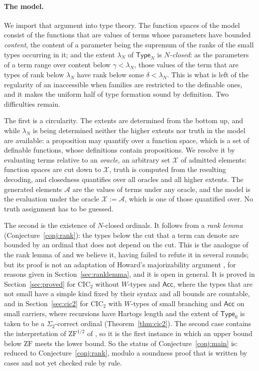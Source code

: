 \documentclass[10pt]{article}
\newcommand{\Type}{\mathsf{Type}}
\newcommand{\CIC}{\mathrm{CIC}}
\newcommand{\ZF}{\mathrm{ZF}}
\newcommand{\ZFh}{\mathrm{ZF}^{1/2}}
\newcommand{\X}{\mathcal{X}}
\newcommand{\A}{\mathcal{A}}
\newcommand{\Acc}{\mathsf{Acc}}
\begin{document}
\paragraph{The model.}
We import that argument into type theory. The function spaces of the
model consist of the functions that are values of terms whose
parameters have bounded \emph{content}, the content of a parameter being
the supremum of the ranks of the small types occurring in it; and the
extent $\lambda_N$ of $\Type_N$ is \emph{$N$-closed}: as the parameters of
a term range over content below $\gamma<\lambda_N$, those values of the
term that are types of rank below $\lambda_N$ have rank below some
$\delta<\lambda_N$. This is what is left of the regularity of an
inaccessible when families are restricted to the definable ones, and
it makes the uniform half of type formation sound by definition. Two
difficulties remain.

The first is a circularity. The extents are determined from the bottom
up, and while $\lambda_N$ is being determined neither the higher
extents nor truth in the model are available: a proposition may
quantify over a function space, which is a set of definable functions,
whose definitions contain propositions. We resolve it by evaluating
terms relative to an \emph{oracle}, an arbitrary set $\X$ of admitted
elements: function spaces are cut down to $\X$, truth is computed from
the resulting decoding, and closedness quantifies over all oracles and
all higher extents. The generated elements $\A$ are the values of terms
under any oracle, and the model is the evaluation under the oracle
$\X:=\A$, which is one of those quantified over. No truth assignment
has to be guessed.

The second is the existence of $N$-closed ordinals. It follows from a
\emph{rank lemma} (Conjecture~\ref{conj:rank}): the types below the cut
that a term can denote are bounded by an ordinal that does not depend
on the cut. This is the analogue of the rank lemma of \cite{paper2} and
we believe it, having failed to refute it in several rounds; but its
proof is not an adaptation of Howard's majorizability argument
\cite{howard73}, for reasons given in Section~\ref{sec:ranklemma}, and
it is open in general. It is proved in Section~\ref{sec:proved} for
$\CIC_2$ without $W$-types and $\Acc$, where the types that are not small
have a simple kind fixed by their syntax and all bounds are countable,
and in Section~\ref{sec:cic2} for $\CIC_2$ with $W$-types of small
branching and $\Acc$ on small carriers, where recursions have Hartogs
length and the extent of $\Type_0$ is taken to be a $\Sigma_2$-correct
ordinal (Theorem~\ref{thm:cic2}). The second case contains the
interpretation of $\ZFh$ of \cite{paper2}, so it is the first instance
in which an upper bound below $\ZF$ meets the lower bound.
So the status of Conjecture~\ref{conj:main} is: reduced to
Conjecture~\ref{conj:rank}, modulo a soundness proof that is written by
cases and not yet checked rule by rule.
\end{document}
